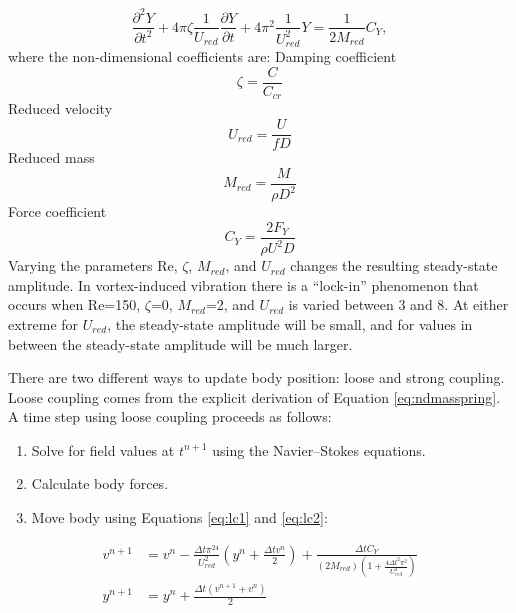 \begin{equation}
\frac{\partial^2 Y}{\partial t^2}+4\pi \zeta\frac{1}{U_{red}}\frac{\partial Y}{\partial t}+4\pi^2\frac{1}{U_{red}^2}Y=\frac{1}{2M_{red}}C_Y,\label{eq:ndmasspring}
\end{equation}
where the non-dimensional coefficients are:\newline
Damping coefficient
\begin{equation}
\zeta=\frac{C}{C_{cr}}\label{eq:damping coefficient}
\end{equation}
Reduced velocity
\begin{equation}
U_{red}=\frac{U}{fD}\label{eq:reduced velocity}
\end{equation}
Reduced mass
\begin{equation}
M_{red}=\frac{M}{\rho D^2}\label{eq:reduced mass}
\end{equation}
Force coefficient
\begin{equation}
C_Y=\frac{2F_Y}{\rho U^2 D}\label{eq:force coefficient}
\end{equation}
Varying the parameters Re, $\zeta$, $M_{red}$, and $U_{red}$ changes the resulting steady-state amplitude. 
In vortex-induced vibration there is a ``lock-in'' phenomenon that occurs when Re=150, $\zeta$=0, $M_{red}$=2, and $U_{red}$ is varied between 3 and 8. 
At either extreme for $U_{red}$, the steady-state amplitude will be small, and for values in between the steady-state amplitude will be much larger. 

There are two different ways to update body position: loose and strong coupling. 
Loose coupling comes from the explicit derivation of Equation \eqref{eq:ndmasspring}.
A time step using loose coupling proceeds as follows:
\begin{enumerate}
	\item Solve for field values at $t^{n+1}$ using the Navier--Stokes equations.
	\item Calculate body forces.
	\item Move body using Equations \eqref{eq:lc1} and \eqref{eq:lc2}:
\end{enumerate}
\begin{align}
v^{n+1} &= v^n-\frac{\Delta t\pi^24}{U_{red}^2}\left(y^n+\frac{\Delta tv^n}{2}\right) + \frac{\Delta tC_Y}{\left(2M_{red}\right)\left(1+\frac{4\Delta t^2\pi^2}{U_{red}^2}\right)} \label{eq:lc1} \\
y^{n+1} &= y^n +\frac{\Delta t\left(v^{n+1}+v^n\right)}{2}\; \label{eq:lc2}
\end{align}

